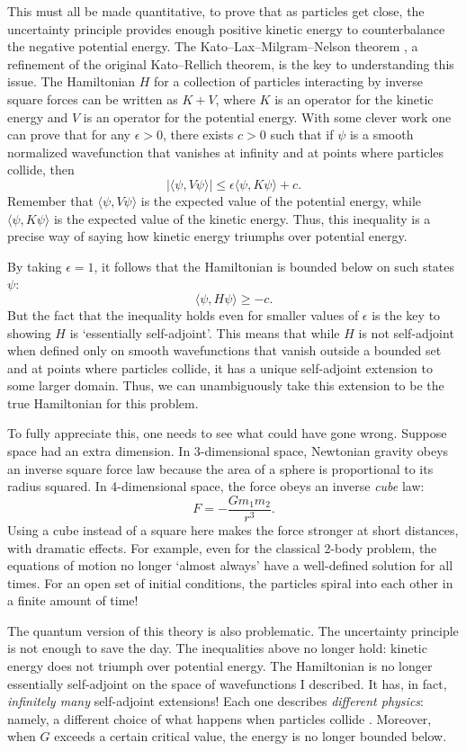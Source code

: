 \documentclass[12pt]{article}
\begin{document}
This must all be made quantitative, to prove that as particles get close, the uncertainty principle provides enough positive kinetic energy to counterbalance the negative potential energy.  The Kato--Lax--Milgram--Nelson theorem \cite{ReedSimon}, a refinement of the original Kato--Rellich theorem, is the key to understanding this issue.  The Hamiltonian $H$ for a collection of particles interacting by inverse square forces can be written as $K + V$, where $K$ is an operator for the kinetic energy and $V$ is an operator for the potential energy.   With some clever work one can prove that for any $\epsilon > 0$, there exists $c > 0$ such that if $\psi$ is a smooth normalized wavefunction that vanishes at infinity and at points where particles collide, then
\[     | \langle \psi , V  \psi \rangle | \le \epsilon \langle \psi, K\psi \rangle + c. \]
Remember that $\langle \psi , V  \psi \rangle$ is the expected value of the potential energy, while $\langle \psi, K \psi \rangle$ is the expected value of the kinetic energy.  Thus, this inequality is a precise way of saying how kinetic energy triumphs over potential energy.

By taking $\epsilon = 1$, it follows that the Hamiltonian is bounded below on such 
states $\psi$:
\[     \langle \psi , H \psi \rangle \ge -c . \]
But the fact that the inequality holds even for smaller values of $\epsilon$ is the key to showing $H$ is `essentially self-adjoint'.  This means that while $H$ is not self-adjoint when defined only on smooth wavefunctions that vanish outside a bounded set and at points where particles collide, it has a unique self-adjoint extension to some larger domain.  Thus, we can unambiguously take this extension to be the true Hamiltonian for this problem.

To fully appreciate this, one needs to see what could have gone wrong.  Suppose space had an extra dimension.  In 3-dimensional space, Newtonian gravity obeys an inverse square force law because the area of a sphere is proportional to its radius squared.  In 4-dimensional space, the force obeys an inverse \emph{cube} law:
\[  F = -\frac{Gm_1 m_2}{r^3}  . \]
Using a cube instead of a square here makes the force stronger at short distances, with dramatic effects.  For example, even for the classical 2-body problem, the equations of motion no longer `almost always' have a well-defined solution for all times.  For an open set of initial conditions, the particles spiral into each other in a finite amount of time!   

The quantum version of this theory is also problematic.  The uncertainty principle is not enough to save the day.  The inequalities above no longer hold: kinetic energy does not triumph over potential energy.   The Hamiltonian is no longer essentially self-adjoint on the space of wavefunctions I described.  It has, in fact, \emph{infinitely many} self-adjoint extensions!  Each one describes \emph{different physics}: namely, a different choice of what happens when particles collide \cite{GTV,Gopalkrishnan}.  Moreover, when $G$ exceeds a certain critical value, the energy is no longer bounded below.  
\end{document}
